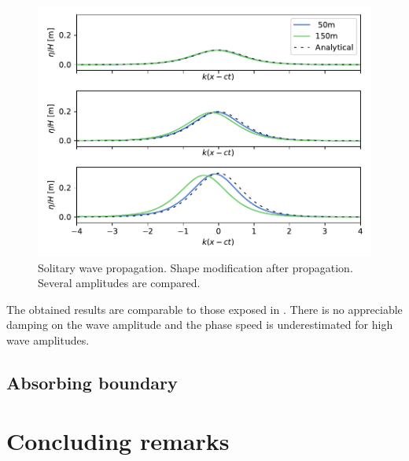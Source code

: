 \begin{figure}[ht]
    \centering
    \includegraphics[width=.8\textwidth]{img/boussinesq/shapes.pdf}
    \caption{Solitary wave propagation. Shape modification after propagation. Several amplitudes are compared.}
    \label{bsq_solitary_wave_shapes}
\end{figure}

The obtained results are comparable to those exposed in \cite{wei1995}. There is no appreciable damping on the wave amplitude and the phase speed is underestimated for high wave amplitudes.

\subsection{Absorbing boundary}




\section{Concluding remarks}



